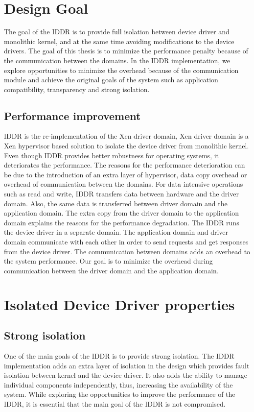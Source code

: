 \section{Design Goal}\label{sec:goals}

The goal of the IDDR is to provide full isolation between device driver and monolithic kernel, and at the same time avoiding modifications to the device drivers. The goal of this thesis is to minimize the performance penalty because of the communication between the domains. In the IDDR implementation, we explore opportunities to minimize the overhead because of the communication module and achieve the original goals of the system such as application compatibility, transparency and strong isolation. 
\\
\subsection{Performance improvement}

IDDR is the re-implementation of the Xen driver domain, Xen driver domain is a Xen hypervisor based solution to isolate the device driver from monolithic kernel. Even though IDDR provides better robustness for operating systems, it deteriorates the performance. The reasons for the performance deterioration can be due to the introduction of an extra layer of hypervisor, data copy overhead or overhead of communication between the domains. For data intensive operations such as read and write, IDDR transfers data between hardware and the driver domain. Also, the same data is transferred between driver domain and the application domain. The extra copy from the driver domain to the application domain explains the reasons for the performance degradation. The IDDR runs the device driver in a separate domain. The application domain and driver domain communicate with each other in order to send requests and get responses from the device driver. The communication between domains adds an overhead to the system performance. Our goal is to minimize the overhead during communication between the driver domain and the application domain.

\section{Isolated Device Driver properties}
\label{sec:properties}
\subsection{Strong isolation}
One of the main goals of the IDDR is to provide strong isolation. The IDDR implementation adds an extra layer of isolation in the design which provides fault isolation between kernel and the device driver. It also adds the ability to manage individual components independently, thus, increasing the availability of the system. While exploring the opportunities to improve the performance of the IDDR, it is essential that the main goal of the IDDR is not compromised.

